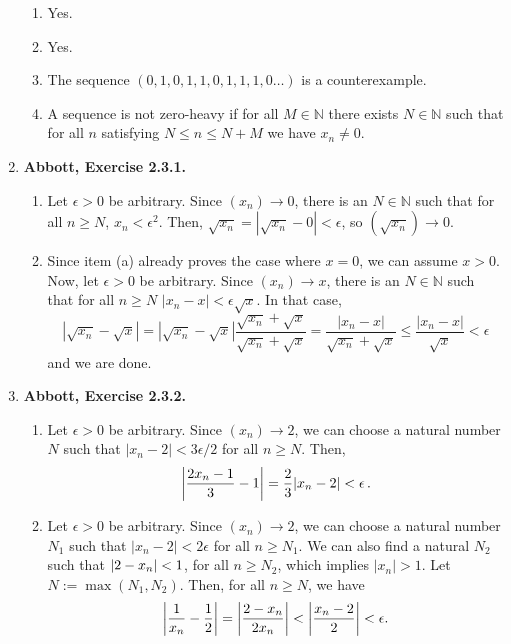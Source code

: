 \documentclass{article}
\DeclarePairedDelimiter\abs{\lvert}{\rvert}
\newcommand{\N}{\mathbb{N}}
\newcommand{\exc}[2][Abbott]{\item \textbf{#1, Exercise #2.}}
\let\oldmax\max
\renewcommand{\max}[1]{\oldmax \left( #1 \right)}
\begin{document}
\begin{enumerate}
	\begin{enumerate}
		\item Yes.
		\item Yes.
		\item The sequence $(0, 1, 0, 1, 1, 0, 1,1,1, 0 \dots)$ is a counterexample.
		\item A sequence is not zero-heavy if for all $M \in \N$ there exists $N \in \N$ such that for all $n$ satisfying $N \leq n \leq N + M$ we have $x_n \neq 0$.
	\end{enumerate}
				      	              
	\exc{2.3.1}
	\begin{enumerate}
		\item  Let $\epsilon > 0$ be arbitrary. Since $(x_n) \rightarrow 0$, there is an $N \in \N$ such that for all $n \geq N$, $x_n < \epsilon^2$. Then, $\sqrt{x_n} = |\sqrt{x_n} - 0| < \epsilon$, so $(\sqrt{x_n}) \rightarrow 0$.
		      		      		      	      	      	      	                  
		\item Since item (a) already proves the case where $x = 0$, we can assume $x > 0$. Now, let $\epsilon > 0$ be arbitrary. Since $(x_n) \rightarrow x$, there is an $N \in \N$ such that for all $n \geq N$ $|x_n-x| < \epsilon \sqrt{x}$. In that case, \begin{equation*}
		      |\sqrt{x_n}-\sqrt{x}| = |\sqrt{x_n}-\sqrt{x}| \frac{\sqrt{x_n}+ \sqrt{x}}{\sqrt{x_n}+ \sqrt{x}} = \frac{|x_n-x|}{\sqrt{x_n}+\sqrt{x}} \leq \frac{|x_n-x|}{\sqrt{x}} < \epsilon
		\end{equation*}
		and we are done.
	\end{enumerate}
				      	              
	\exc{2.3.2}
				      	              
	\begin{enumerate}
		\item Let $\epsilon > 0$ be arbitrary. Since $(x_n) \rightarrow 2$, we can choose a natural number $N$ such that $|x_n-2| < 3\epsilon/2$ for all $n \geq N$. Then, \begin{equation*}
		      \abs*{\frac{2x_n-1}{3}-1} = \frac{2}{3}|x_n-2| < \epsilon \, .
		\end{equation*}
							      		      	            
		\item Let $\epsilon > 0$ be arbitrary. Since $(x_n) \rightarrow 2$, we can choose a natural number $N_1$ such that $|x_n-2| < 2\epsilon$ for all $n \geq N_1$. We can also find a natural $N_2$ such that $\abs*{2-x_n} < 1$, for all $n \geq N_2$, which implies $|x_n| > 1$. Let $N := \max{N_1, N_2}$. Then, for all $n \geq N$, we have \begin{equation*}
		      \abs*{\frac{1}{x_n}-\frac{1}{2}} = \abs*{\frac{2-x_n}{2x_n}} < \abs*{\frac{x_n-2}{2}} < \epsilon.
		\end{equation*}
	\end{enumerate}
	

\end{enumerate}
\end{document}
